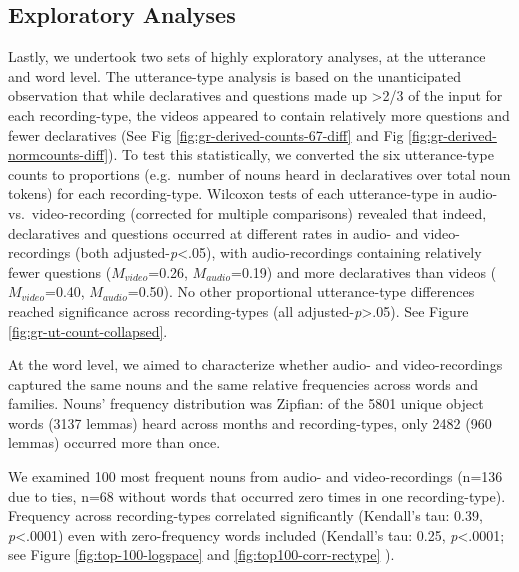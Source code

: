 \documentclass[man]{apa6}
\theoremstyle{definition}
\theoremstyle{definition}
\theoremstyle{definition}
\theoremstyle{remark}
\begin{document}
\subsection{Exploratory Analyses}\label{exploratory-analyses}

Lastly, we undertook two sets of highly exploratory analyses, at the
utterance and word level. The utterance-type analysis is based on the
unanticipated observation that while declaratives and questions made up
\textgreater{}2/3 of the input for each recording-type, the videos
appeared to contain relatively more questions and fewer declaratives
(See Fig \ref{fig:gr-derived-counts-67-diff} and Fig
\ref{fig:gr-derived-normcounts-diff}). To test this statistically, we
converted the six utterance-type counts to proportions (e.g.~number of
nouns heard in declaratives over total noun tokens) for each
recording-type. Wilcoxon tests of each utterance-type in audio-
vs.~video-recording (corrected for multiple comparisons) revealed that
indeed, declaratives and questions occurred at different rates in audio-
and video-recordings (both adjusted-\emph{p}\textless{}.05), with
audio-recordings containing relatively fewer questions
(\(M_{video}\)=0.26, \(M_{audio}\)=0.19) and more declaratives than
videos (\(M_{video}\)=0.40, \(M_{audio}\)=0.50). No other proportional
utterance-type differences reached significance across recording-types
(all adjusted-\emph{p}\textgreater{}.05). See Figure
\ref{fig:gr-ut-count-collapsed}.

At the word level, we aimed to characterize whether audio- and
video-recordings captured the same nouns and the same relative
frequencies across words and families. Nouns' frequency distribution was
Zipfian: of the 5801 unique object words (3137 lemmas) heard across
months and recording-types, only 2482 (960 lemmas) occurred more than
once.

We examined 100 most frequent nouns from audio- and video-recordings
(n=136 due to ties, n=68 without words that occurred zero times in one
recording-type). Frequency across recording-types correlated
significantly (Kendall's tau: 0.39, \emph{p}\textless{}.0001) even with
zero-frequency words included (Kendall's tau: 0.25,
\emph{p}\textless{}.0001; see Figure \ref{fig:top-100-logspace} and
\ref{fig:top100-corr-rectype} ).
\end{document}
